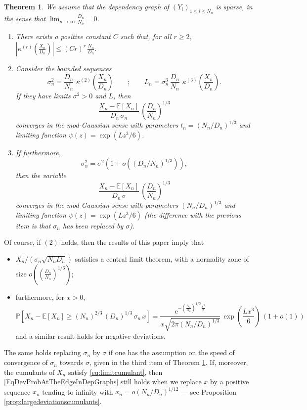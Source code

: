 \documentclass[12pt,a4paper,reqno]{amsart}
\newtheorem{theorem}[lemma]{Theorem}
\theoremstyle{remark}
\newcommand{\E}{\mathrm{e}}
\newcommand{\esper}{\mathbb{E}}
\newcommand{\proba}{\mathbb{P}}
\begin{document}
\begin{theorem}\label{thm:modgaussiangeneralsparsegraph}
We assume that the dependency graph of $(Y_i)_{1\leq i \leq N_n}$ is sparse, in the sense that $\lim_{n \to \infty} \frac{D_n}{N_n} = 0 $.\vspace{2mm}
\begin{enumerate}
	\item There exists a positive constant $C$ such that, for all $r \geq 2$, 
$ \left|\kappa^{(r)}\!\left(\frac{X_n}{D_n}\right)\right| \leq (Cr)^r\,\frac{N_n}{D_n}.$\vspace{2mm}
	\item Consider the bounded sequences 
	$$\sigma^2_n=\frac{D_n}{N_n}\,\,\kappa^{(2)}\!\left(\frac{X_n}{D_n}\right)\qquad;\qquad L_n=\sigma_n^3\,\frac{D_n}{N_n}\,\,\kappa^{(3)}\!\left(\frac{X_n}{D_n}\right).$$
	If they have limits $\sigma^2>0$ and $L$, then $$\frac{X_n-\esper[X_n]}{D_n\,\sigma_n}\,\left(\frac{D_n}{N_n}\right)^{1/3}$$ converges in the mod-Gaussian sense with parameters $t_n=(N_n/D_n)^{1/3}$ and limiting function $\psi(z)=\exp(Lz^3/6)$.\vspace{2mm}
\item If furthermore,
    \[ \sigma^2_n = \sigma^2 \left(1 + o\!\left( (D_n/N_n)^{1/3}\right) \right), \]
    then the variable
    \[\frac{X_n-\esper[X_n]}{D_n\,\sigma}\,\left(\frac{D_n}{N_n}\right)^{1/3}\]
    converges in the mod-Gaussian sense with parameters $(N_n/D_n)^{1/3}$ and limiting function $\psi(z)=\exp(Lz^3/6)$
    (the difference with the previous item is that $\sigma_n$ has been replaced by $\sigma$).
\end{enumerate}
\end{theorem}


Of course, if $(2)$ holds, then the results of this paper imply that 
\begin{itemize}
\item $X_n/(\sigma_n \sqrt{N_n D_n})$ satisfies a central limit
theorem, with a normality zone of size $o\!\left(\left(\frac{D_n}{N_n}\right)^{1/6}\right)$;
\item furthermore, for $x>0$,
\begin{equation}
    \label{EqDevProbAtTheEdgeInDepGraphs}
    \proba[X_n-\esper[X_n] \geq (N_n)^{2/3}\,(D_n)^{1/3}\,\sigma_n\,x]=\frac{\E^{-\left(\frac{N_n}{D_n}\right)^{1/3}\frac{x^2}{2}}}{x\sqrt{2\pi (N_n/D_n)^{1/3} }}\,\exp\left(\frac{Lx^3}{6}\right)\,(1+o(1))
\end{equation}
and a similar result holds for negative deviations.
\end{itemize}
The same holds replacing $\sigma_n$ by $\sigma$ if one has the assumption on the speed of convergence of $\sigma_n$ towards $\sigma$, given in the third item of Theorem \ref{thm:modgaussiangeneralsparsegraph}.
If, moreover, the cumulants of $X_n$ satisfy \eqref{eq:limitcumulant},
then \eqref{EqDevProbAtTheEdgeInDepGraphs} still holds when we replace $x$ by a positive sequence $x_n$
tending to infinity with $x_n=o(N_n/D_n)^{1/12}$ --- see Proposition \ref{prop:largedeviationscumulants}.
\end{document}
